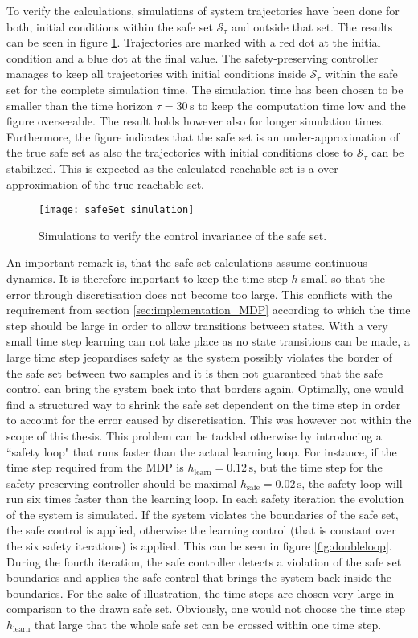 \documentclass[../main.tex]{subfiles}
\begin{document}
To verify the calculations, simulations of system trajectories have been done for both, initial conditions within the safe set $\mathcal{S}_\tau$ and outside that set. The results can be seen in figure \ref{fig:safeSet_simulation}. Trajectories are marked with a red dot at the initial condition and a blue dot at the final value. The safety-preserving controller manages to keep all trajectories with initial conditions inside $\mathcal{S}_\tau$ within the safe set for the complete simulation time. The simulation time has been chosen to be smaller than the time horizon $\tau = 30 \,\text{s}$ to keep the computation time low and the figure overseeable. The result holds however also for longer simulation times. Furthermore, the figure indicates that the safe set is an under-approximation of the true safe set as also the trajectories with initial conditions close to $\mathcal{S}_\tau$ can be stabilized. This is expected as the calculated reachable set is a over-approximation of the true reachable set. \par
\begin{figure}[h]
    \centering
    \texttt{[image: safeSet\_simulation]}
        \caption{Simulations to verify the control invariance of the safe set.}    
    \label{fig:safeSet_simulation}
\end{figure}
An important remark is, that the safe set calculations assume continuous dynamics. It is therefore important to keep the time step $h$ small so that the error through discretisation does not become too large. This conflicts with the requirement from section \ref{sec:implementation_MDP} according to which the time step should be large in order to allow transitions between states. With a very small time step learning can not take place as no state transitions can be made, a large time step jeopardises safety as the system possibly violates the border of the safe set between two samples and it is then not guaranteed that the safe control can bring the system back into that borders again. Optimally, one would find a structured way to shrink the safe set dependent on the time step in order to account for the error caused by discretisation. This was however not within the scope of this thesis. This problem can be tackled otherwise by introducing a ``safety loop" that runs faster than the actual learning loop. For instance, if the time step required from the MDP is $h_{\text{learn}} = 0.12\,\text{s}$, but the time step for the safety-preserving controller should be maximal $h_{\text{safe}} = 0.02\,\text{s}$, the safety loop will run six times faster than the learning loop. In each safety iteration the evolution of the system is simulated. If the system violates the boundaries of the safe set, the safe control is applied, otherwise the learning control (that is constant over the six safety iterations) is applied. This can be seen in figure \ref{fig:doubleloop}. During the fourth iteration, the safe controller detects a violation of the safe set boundaries and applies the safe control that brings the system back inside the boundaries. For the sake of illustration, the time steps are chosen very large in comparison to the drawn safe set. Obviously, one would not choose the time step $h_{\text{learn}}$ that large that the whole safe set can be crossed within one time step.
\end{document}
